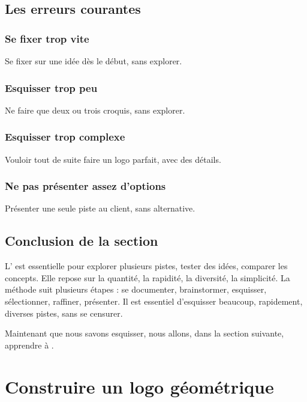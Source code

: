 \subsection{Les erreurs courantes}

\subsubsection{Se fixer trop vite}

Se fixer sur une idée dès le début, sans explorer.

\subsubsection{Esquisser trop peu}

Ne faire que deux ou trois croquis, sans explorer.

\subsubsection{Esquisser trop complexe}

Vouloir tout de suite faire un logo parfait, avec des détails.

\subsubsection{Ne pas présenter assez d'options}

Présenter une seule piste au client, sans alternative.

\subsection*{Conclusion de la section}

L' est essentielle pour explorer plusieurs pistes, tester des idées, comparer les concepts. Elle repose sur la quantité, la rapidité, la diversité, la simplicité. La méthode suit plusieurs étapes : se documenter, brainstormer, esquisser, sélectionner, raffiner, présenter. Il est essentiel d'esquisser beaucoup, rapidement, diverses pistes, sans se censurer.

Maintenant que nous savons esquisser, nous allons, dans la section suivante, apprendre à .

\section{Construire un logo géométrique}

